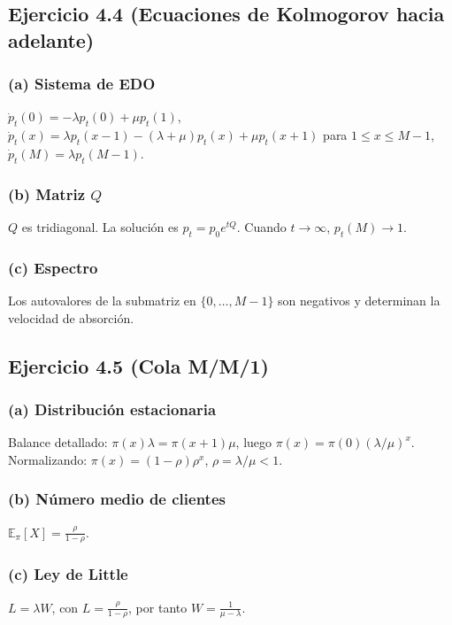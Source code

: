 \documentclass[letterpaper, 12pt]{article}
\newcommand{\E}{\mathbb{E}}
\newcommand{\1}{\mathbbm{1}}
\begin{document}
    \subsection{Ejercicio 4.4 (Ecuaciones de Kolmogorov hacia adelante)}

    \subsubsection*{(a) Sistema de EDO}
    $\dot{p}_t(0)=-\lambda p_t(0)+\mu p_t(1)$, $\dot{p}_t(x)=\lambda p_t(x-1)-(\lambda+\mu)p_t(x)+\mu p_t(x+1)$ para $1\le x\le M-1$, $\dot{p}_t(M)=\lambda p_t(M-1)$.

    \subsubsection*{(b) Matriz $Q$}
    $Q$ es tridiagonal. La soluci\'on es $p_t=p_0 e^{tQ}$. Cuando $t\to\infty$, $p_t(M)\to1$.

    \subsubsection*{(c) Espectro}
    Los autovalores de la submatriz en $\{0,\dots,M-1\}$ son negativos y determinan la velocidad de absorci\'on.

    \subsection{Ejercicio 4.5 (Cola M/M/1)}

    \subsubsection*{(a) Distribuci\'on estacionaria}
    Balance detallado: $\pi(x)\lambda=\pi(x+1)\mu$, luego $\pi(x)=\pi(0)(\lambda/\mu)^x$. Normalizando: $\pi(x)=(1-\rho)\rho^x$, $\rho=\lambda/\mu<1$.

    \subsubsection*{(b) N\'umero medio de clientes}
    $\E_\pi[X]=\frac{\rho}{1-\rho}$.

    \subsubsection*{(c) Ley de Little}
    $L=\lambda W$, con $L=\frac{\rho}{1-\rho}$, por tanto $W=\frac{1}{\mu-\lambda}$.
\end{document}

